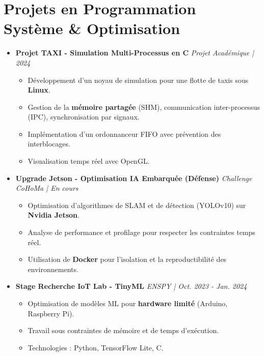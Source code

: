 \documentclass[a4paper,11pt]{article}
\begin{document}
\section{Projets en Programmation Système \& Optimisation}
\begin{itemize}[leftmargin=*, label={-}]

\item \textbf{Projet TAXI - Simulation Multi-Processus en C} \hfill \textit{Projet Académique | 2024}
\vspace{-2pt}
\begin{itemize}[leftmargin=0.4cm, nosep, label=\tiny$\bullet$]
    \item \small{Développement d'un noyau de simulation pour une flotte de taxis sous \textbf{Linux}.}
    \item \small{Gestion de la \textbf{mémoire partagée} (SHM), communication inter-processus (IPC), synchronisation par signaux.}
    \item \small{Implémentation d'un ordonnanceur FIFO avec prévention des interblocages.}
    \item \small{Visualisation temps réel avec OpenGL.}
\end{itemize}
\vspace{3pt}

\item \textbf{Upgrade Jetson - Optimisation IA Embarquée (Défense)} \hfill \textit{Challenge CoHoMa | En cours}
\vspace{-2pt}
\begin{itemize}[leftmargin=0.4cm, nosep, label=\tiny$\bullet$]
    \item \small{Optimisation d'algorithmes de SLAM et de détection (YOLOv10) sur \textbf{Nvidia Jetson}.}
    \item \small{Analyse de performance et profilage pour respecter les contraintes temps réel.}
    \item \small{Utilisation de \textbf{Docker} pour l'isolation et la reproductibilité des environnements.}
\end{itemize}
\vspace{3pt}

\item \textbf{Stage Recherche IoT Lab - TinyML} \hfill \textit{ENSPY | Oct. 2023 - Jan. 2024}
\vspace{-2pt}
\begin{itemize}[leftmargin=0.4cm, nosep, label=\tiny$\bullet$]
    \item \small{Optimisation de modèles ML pour \textbf{hardware limité} (Arduino, Raspberry Pi).}
    \item \small{Travail sous contraintes de mémoire et de temps d'exécution.}
    \item \small{Technologies : Python, TensorFlow Lite, C.}
\end{itemize}
\vspace{3pt}


\end{itemize}
\end{document}
